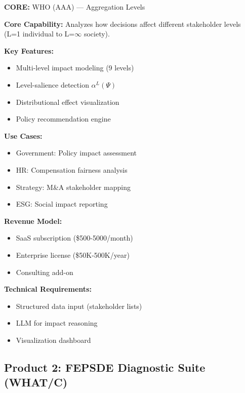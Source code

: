 \begin{tcolorbox}[colback=red!5!white, colframe=red!75!black,
    title=Product: Stakeholder Impact Analyzer]

\textbf{CORE:} WHO (AAA) --- Aggregation Levels

\textbf{Core Capability:}
Analyzes how decisions affect different stakeholder levels (L=1 individual to L=$\infty$ society).

\textbf{Key Features:}
\begin{itemize}[nosep]
\item Multi-level impact modeling (9 levels)
\item Level-salience detection $\alpha^L(\Psi)$
\item Distributional effect visualization
\item Policy recommendation engine
\end{itemize}

\textbf{Use Cases:}
\begin{itemize}[nosep]
\item Government: Policy impact assessment
\item HR: Compensation fairness analysis
\item Strategy: M\&A stakeholder mapping
\item ESG: Social impact reporting
\end{itemize}

\textbf{Revenue Model:}
\begin{itemize}[nosep]
\item SaaS subscription (\$500-5000/month)
\item Enterprise license (\$50K-500K/year)
\item Consulting add-on
\end{itemize}

\textbf{Technical Requirements:}
\begin{itemize}[nosep]
\item Structured data input (stakeholder lists)
\item LLM for impact reasoning
\item Visualization dashboard
\end{itemize}

\end{tcolorbox}


\subsection{Product 2: FEPSDE Diagnostic Suite (WHAT/C)}

